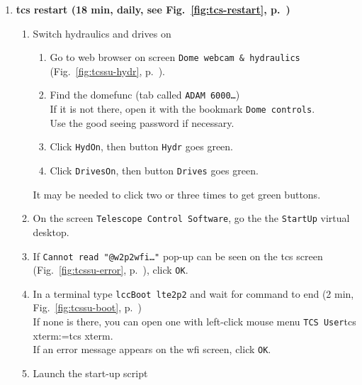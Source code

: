 \documentclass[11pt,fleqn]{book}
\makeatletter
\def\menu#1#2{\texttt{#1}\ifx{}#2\else\@for\@x:=#2\do{$\rightarrow$\texttt{\@x}}\fi}
\def\wmenu#1#2{window menu \menu{#1}{#2}}
\def\mmenu#1#2{left-click mouse menu \menu{#1}{#2}}
\def\fetchob{\wmenu{File}{Load OBs,From file...}}
\def\figref#1{Fig.~\ref{fig:#1}, p.~\pageref{fig:#1}}
\makeatother
\begin{document}
\begin{enumerate}
\begin{enumerate}
          \item In \gls{bob}, execute \texttt{testOB.obd} (1 min)
             \label{list:wfitest}
             \begin{enumerate}
               \item Import it with \fetchob.
               \item Click the \texttt{Start} button. 
             \end{enumerate}
        \end{enumerate}
  \item \textbf{\gls{tcs} restart (18 min, daily, see \figref{tcs-restart})}
        \begin{enumerate}
        \item\label{lab:hydron} Switch hydraulics and drives on
             \begin{enumerate}
               \item Go to web browser on screen \texttt{Dome webcam \& hydraulics} (\figref{tcssu-hydr}). 
               \item Find the \gls{domefunc} (tab called \texttt{ADAM 6000…})\\
                     If it is not there, open it with the bookmark \texttt{Dome controls}.\\
                     Use the good seeing password if necessary.
               \item Click \texttt{HydOn}, then button \texttt{Hydr} goes green.
               \item Click \texttt{DrivesOn}, then button \texttt{Drives} goes green.
             \end{enumerate}
             It may be needed to click two or three times to get green buttons.
             \label{list:hydr}
          \item On the screen \texttt{Telescope Control Software}, go the the \texttt{StartUp} virtual desktop.\label{list:tcs1}
          \item If \texttt{Cannot read "@w2p2wfi…"} pop-up can be seen on the \gls{tcs} screen (\figref{tcssu-error}), click \texttt{OK}.
          \item In a terminal type \texttt{lccBoot lte2p2} and wait for command to end (2 min, \figref{tcssu-boot})\\
                If none is there, you can open one with \mmenu{TCS User}{tcs xterm}.\\
                If an error message appears on the \gls{wfi} screen, click \texttt{OK}. 
          \item Launch the start-up script

\end{enumerate}
\end{enumerate}
\end{document}

